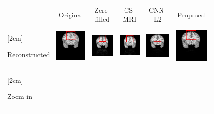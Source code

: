 \documentclass[review]{elsarticle}
\begin{document}
\begin{figure}
	\begin{raggedright}
		
		\begin{tabular}{>{\centering}b{0.2cm}lcccc}
			& \multicolumn{1}{c}{{\footnotesize{}Original}} & {\footnotesize{}Zero-filled} & {\footnotesize{}CS-MRI} & {\footnotesize{}CNN-L2} & {\footnotesize{}Proposed}\tabularnewline
			\multirow{1}{0.2cm}[2cm]{\begin{turn}{90}
					{\footnotesize{}Reconstructed}
				\end{turn}} & \includegraphics[width=2.5cm]{include/grp1/res1_org} & \includegraphics[width=2.5cm]{include/grp1/res1_zero} & \includegraphics[width=2.5cm]{include/grp1/res1_cs_red} & \includegraphics[width=2.5cm]{include/grp1/res1_L2_red} & \includegraphics[width=2.5cm]{include/grp1/res1_our}\tabularnewline
				\multirow{1}{0.2cm}[2cm]{\begin{turn}{90}
						{\footnotesize{}Zoom in}

\end{turn}}
\end{tabular}
\end{raggedright}
\end{figure}
\end{document}
